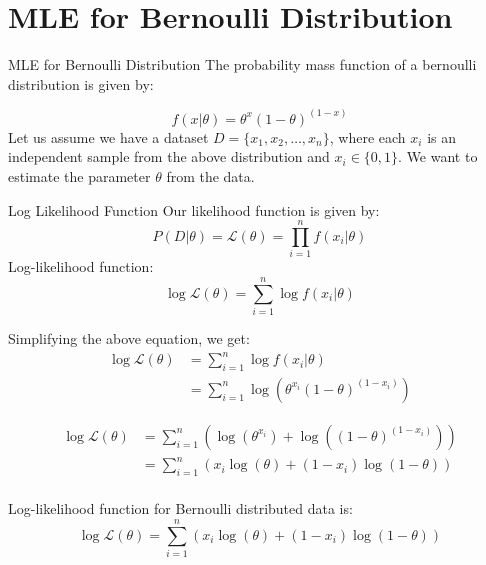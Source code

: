 \documentclass[handout]{beamer}
\begin{document}
\section{MLE for Bernoulli Distribution}
\begin{frame}{MLE for Bernoulli Distribution}
The probability mass function of a bernoulli distribution is given by:

\begin{equation}
f(x|\theta) = \theta^x(1-\theta)^{(1-x)}
\end{equation}
Let us assume we have a dataset $D = \{x_1, x_2, \ldots, x_n\}$, where each $x_i$ is an independent sample from the above distribution and $x_i\in\{0, 1\}$.
We want to estimate the parameter $\theta$ from the data.


\end{frame}

\begin{frame}{Log Likelihood Function}
Our likelihood function is given by:
\begin{equation}
P(D|\theta) = \mathcal{L}(\theta) = \prod_{i=1}^n f(x_i|\theta)
\end{equation}
    Log-likelihood function:
    \begin{equation}
        \log \mathcal{L}(\theta) = \sum_{i=1}^n \log f(x_i|\theta)
    \end{equation}

    Simplifying the above equation, we get:
    \begin{align*}
        \log \mathcal{L}(\theta) &= \sum_{i=1}^n \log f(x_i|\theta) \\
        &= \sum_{i=1}^n \log \left (\theta^{x_{i}}(1-\theta)^{(1-x_{i})} \right)         
        \end{align*}
\end{frame}
\begin{frame}
   
    \begin{align*}
        \log \mathcal{L}(\theta) &=  \sum_{i=1}^n \left( \log \left( \theta^{x_{i}} \right) + \log \left( (1-\theta)^{(1-x_{i})}  \right) \right) \\
        &=\sum_{i=1}^n \left (x_{i}\log \left( \theta \right) + (1-x_{i})\log \left(1-\theta \right) \right)\\
        \end{align*}
        \begin{tcolorbox}[colback=metropolisblue!5,colframe=metropolisblue,title=Log Likelihood Function for Bernoulli Distribution]
            Log-likelihood function for Bernoulli distributed data is:
            \[
                \log \mathcal{L}(\theta) = \sum_{i=1}^n  (x_{i}\log(\theta) + (1-x_{i})\log(1-\theta))
                \]
        \end{tcolorbox}
\end{frame}
\end{document}
